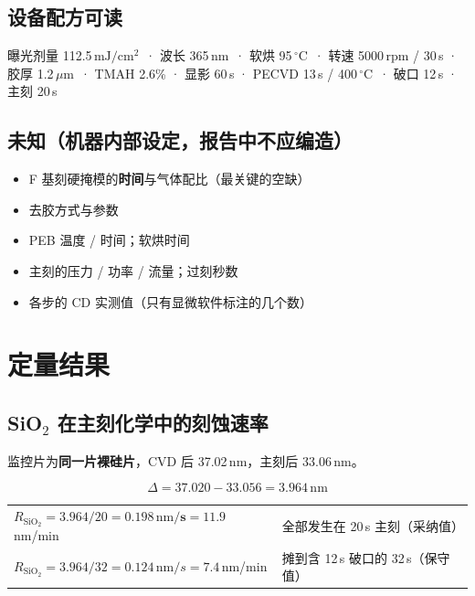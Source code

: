 \documentclass[UTF8,a4paper,11pt,fontset=windows]{ctexart}
\newcommand{\um}{\ensuremath{\,\mu\mathrm{m}}}
\newcommand{\nm}{\ensuremath{\,\mathrm{nm}}}
\newcommand{\degC}{\ensuremath{\,^{\circ}\mathrm{C}}}
\newcommand{\mjs}{\ensuremath{\,\mathrm{mJ/cm^2}}}
\begin{document}
\subsection{设备配方可读}

曝光剂量 112.5\mjs\ · 波长 365\nm\ · 软烘 95\degC\ · 转速 5000\,rpm / 30\,s · 胶厚 1.2\um\
· TMAH 2.6\% · 显影 60\,s · PECVD 13\,s / 400\degC\ · 破口 12\,s · 主刻 20\,s

\subsection{未知（机器内部设定，报告中不应编造）}

\begin{doubtbox}
\begin{itemize}
  \item F 基刻硬掩模的\textbf{时间}与气体配比（最关键的空缺）
  \item 去胶方式与参数
  \item PEB 温度 / 时间；软烘时间
  \item 主刻的压力 / 功率 / 流量；过刻秒数
  \item 各步的 CD 实测值（只有显微软件标注的几个数）
\end{itemize}
\end{doubtbox}

\section{定量结果}

\subsection{SiO$_2$ 在主刻化学中的刻蚀速率}

监控片为\textbf{同一片裸硅片}，CVD 后 37.02\nm，主刻后 33.06\nm。

\begin{keybox}[关键推导]
\[
\Delta = 37.020 - 33.056 = 3.964\nm
\]
\begin{center}\small
\begin{tabular}{@{}ll@{}}
$R_{\mathrm{SiO_2}} = 3.964/20 = \mathbf{0.198\nm/s} = 11.9$\,nm/min & 全部发生在 20\,s 主刻（采纳值）\\[3pt]
$R_{\mathrm{SiO_2}} = 3.964/32 = 0.124\nm/s = 7.4$\,nm/min & 摊到含 12\,s 破口的 32\,s（保守值）
\end{tabular}
\end{center}
\end{keybox}
\end{document}

